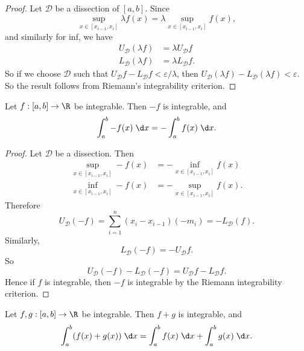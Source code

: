\documentclass[a4paper]{article}
\begin{document}
\begin{proof}
  Let $\mathcal{D}$ be a dissection of $[a, b]$. Since
  \[
    \sup_{x\in [x_{i - 1}, x_i]}\lambda f(x) = \lambda\sup_{x\in [x_{i - 1}, x_i]}f(x),
  \]
  and similarly for inf, we have
  \begin{align*}
    U_{\mathcal{D}}(\lambda f) &= \lambda U_{\mathcal{D}} f\\
    L_{\mathcal{D}}(\lambda f) &= \lambda L_\mathcal{D} f.
  \end{align*}
  So if we choose $\mathcal{D}$ such that $U_{\mathcal{D}}f - L_\mathcal{D} f < \varepsilon/\lambda$, then $U_\mathcal{D}(\lambda f) - L_\mathcal{D}(\lambda f) < \varepsilon$. So the result follows from Riemann's integrability criterion.
\end{proof}

\begin{prop}
  Let $f: [a, b] \to \R$ be integrable. Then $-f$ is integrable, and
  \[
    \int_a^b -f(x)\;\d x = -\int_a^bf(x)\;\d x.
  \]
\end{prop}

\begin{proof}
  Let $\mathcal{D}$ be a dissection. Then
  \begin{align*}
    \sup_{x\in [x_{i - 1}, x_i]}-f(x) &= -\inf_{x\in [x_{i - 1}, x_i]} f(x)\\
    \inf_{x\in [x_{i - 1}, x_i]}-f(x) &= -\sup_{x\in [x_{i - 1}, x_i]} f(x).
  \end{align*}
  Therefore
  \[
    U_\mathcal{D}(-f) = \sum_{i = 1}^n (x_i - x_{i - 1})(-m_i) = -L_\mathcal{D}(f).
  \]
  Similarly,
  \[
    L_\mathcal{D}(-f) = -U_\mathcal{D}f.
  \]
  So
  \[
    U_\mathcal{D}(-f) - L_\mathcal{D}(-f) = U_\mathcal{D}f - L_\mathcal{D}f.
  \]
  Hence if $f$ is integrable, then $-f$ is integrable by the Riemann integrability criterion.
\end{proof}

\begin{prop}
  Let $f, g: [a, b] \to \R$ be integrable. Then $f + g$ is integrable, and
  \[
    \int_a^b(f(x) + g(x))\;\d x = \int_a^b f(x)\;\d x + \int_a^b g(x)\;\d x.
  \]
\end{prop}
\end{document}
